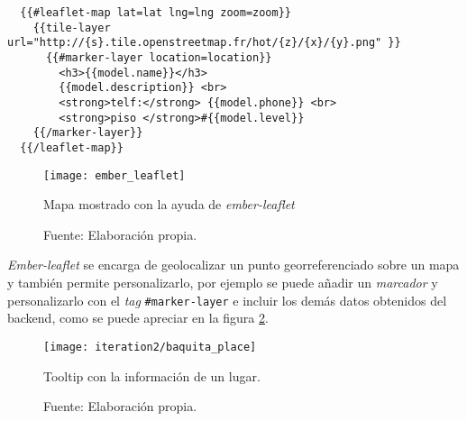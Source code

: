 \begin{verbatim}
  {{#leaflet-map lat=lat lng=lng zoom=zoom}}
    {{tile-layer url="http://{s}.tile.openstreetmap.fr/hot/{z}/{x}/{y}.png" }}
      {{#marker-layer location=location}}
        <h3>{{model.name}}</h3>
        {{model.description}} <br>
        <strong>telf:</strong> {{model.phone}} <br>
        <strong>piso </strong>#{{model.level}}
    {{/marker-layer}}
  {{/leaflet-map}}
\end{verbatim}


\begin{figure}[H]
      \begin{center}
        \texttt{[image: ember\_leaflet]}

        \caption{ Mapa mostrado con la ayuda de \emph{ember-leaflet}}
        \label{fig:ember_leaflet}
        \caption*{Fuente: Elaboración propia.}
      \end{center}
\end{figure}

\emph{Ember-leaflet} se encarga de geolocalizar un punto georreferenciado sobre un mapa y también permite personalizarlo, por ejemplo se puede añadir un \emph{marcador}  y personalizarlo con el \emph{tag} \verb|#marker-layer| e incluir los demás datos obtenidos del backend, como se puede apreciar en la figura \ref{fig:baquita_place}.


\begin{figure}[H]
  \begin{center}
    \texttt{[image: iteration2/baquita\_place]}
    \caption{Tooltip con la información de un lugar.}
    \label{fig:baquita_place}
    \caption*{Fuente: Elaboración propia.}
  \end{center}
\end{figure}











